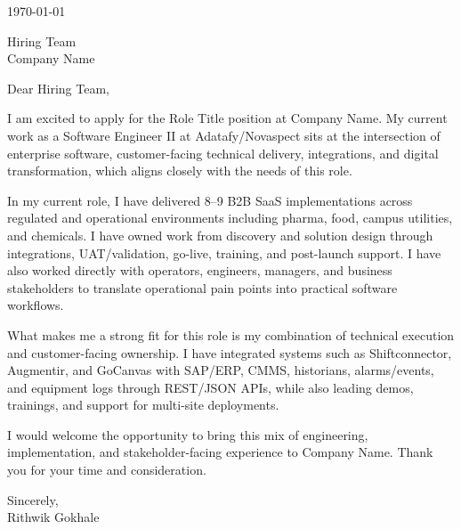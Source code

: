 \documentclass[10pt]{article}
\begin{document}

\today

Hiring Team\\
Company Name


Dear Hiring Team,

I am excited to apply for the Role Title position at Company Name. My current work as a Software Engineer II at Adatafy/Novaspect sits at the intersection of enterprise software, customer-facing technical delivery, integrations, and digital transformation, which aligns closely with the needs of this role.

In my current role, I have delivered 8--9 B2B SaaS implementations across regulated and operational environments including pharma, food, campus utilities, and chemicals. I have owned work from discovery and solution design through integrations, UAT/validation, go-live, training, and post-launch support. I have also worked directly with operators, engineers, managers, and business stakeholders to translate operational pain points into practical software workflows.

What makes me a strong fit for this role is my combination of technical execution and customer-facing ownership. I have integrated systems such as Shiftconnector, Augmentir, and GoCanvas with SAP/ERP, CMMS, historians, alarms/events, and equipment logs through REST/JSON APIs, while also leading demos, trainings, and support for multi-site deployments.

I would welcome the opportunity to bring this mix of engineering, implementation, and stakeholder-facing experience to Company Name. Thank you for your time and consideration.

Sincerely,\\
Rithwik Gokhale
\end{document}
